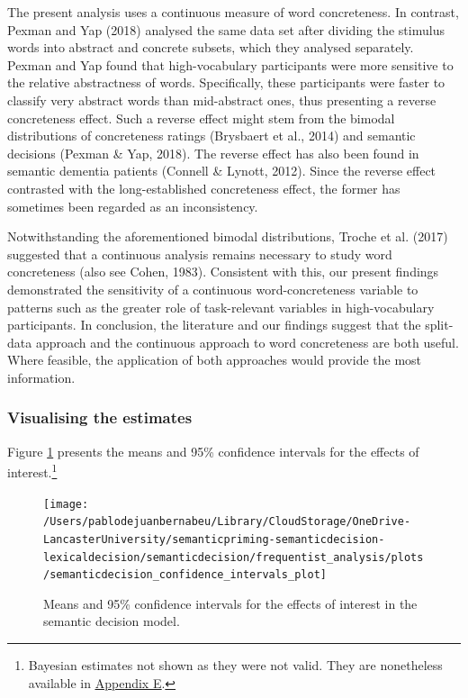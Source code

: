 \documentclass[
  12pt,
  man,floatsintext]{apa7}
\begin{document}
The present analysis uses a continuous measure of word concreteness. In contrast, Pexman and Yap (2018) analysed the same data set after dividing the stimulus words into abstract and concrete subsets, which they analysed separately. Pexman and Yap found that high-vocabulary participants were more sensitive to the relative abstractness of words. Specifically, these participants were faster to classify very abstract words than mid-abstract ones, thus presenting a reverse concreteness effect. Such a reverse effect might stem from the bimodal distributions of concreteness ratings (Brysbaert et al., 2014) and semantic decisions (Pexman \& Yap, 2018). The reverse effect has also been found in semantic dementia patients (Connell \& Lynott, 2012). Since the reverse effect contrasted with the long-established concreteness effect, the former has sometimes been regarded as an inconsistency.

Notwithstanding the aforementioned bimodal distributions, Troche et al. (2017) suggested that a continuous analysis remains necessary to study word concreteness (also see Cohen, 1983). Consistent with this, our present findings demonstrated the sensitivity of a continuous word-concreteness variable to patterns such as the greater role of task-relevant variables in high-vocabulary participants. In conclusion, the literature and our findings suggest that the split-data approach and the continuous approach to word concreteness are both useful. Where feasible, the application of both approaches would provide the most information.

\hypertarget{visualising-the-estimates-1}{%
\subsubsection{Visualising the estimates}\label{visualising-the-estimates-1}}

Figure \ref{fig:semanticdecision-confidence-intervals-plot} presents the means and 95\% confidence intervals for the effects of interest.\footnote{Bayesian estimates not shown as they were not valid. They are nonetheless available in \protect\hyperlink{appendix-E-Bayesian-analysis-results}{\underline{Appendix E}}.}

\begin{figure}

{\centering \texttt{[image: /Users/pablodejuanbernabeu/Library/CloudStorage/OneDrive-LancasterUniversity/semanticpriming-semanticdecision-lexicaldecision/semanticdecision/frequentist\_analysis/plots/semanticdecision\_confidence\_intervals\_plot]} 

}

\caption{Means and 95\% confidence intervals for the effects of interest in the semantic decision model.}\label{fig:semanticdecision-confidence-intervals-plot}
\end{figure}
\end{document}
